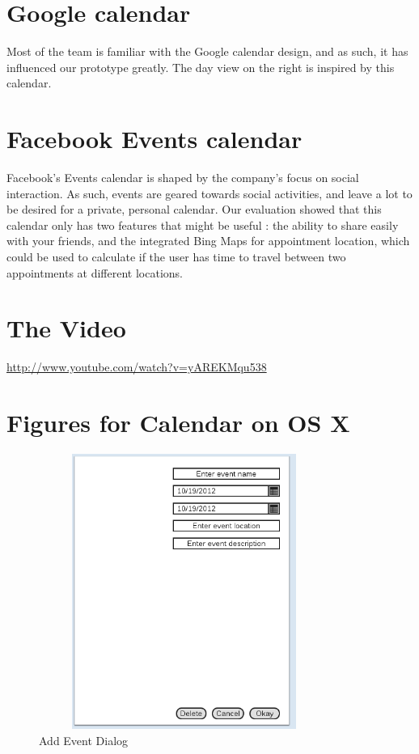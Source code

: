 \documentclass{article}
\begin{document}
\section{Google calendar}

Most of the team is familiar with the Google calendar design, and as such, it 
has influenced our prototype greatly. The day view on the right is inspired by 
this calendar.

\section{Facebook Events calendar}

Facebook's Events calendar is shaped by the company's focus on social 
interaction. As such, events are geared towards social activities, and leave a 
lot to be desired for a private, personal calendar. Our evaluation showed that 
this calendar only has two features that might be useful : the ability to share 
easily with your friends, and the integrated Bing Maps for appointment location, 
which could be used to calculate if the user has time to travel between two 
appointments at different locations.


\section{The Video}

\url{http://www.youtube.com/watch?v=yAREKMqu538}


\appendix

\section{Figures for Calendar on OS X}

\begin{figure}
\centering
\includegraphics[height=9cm,width=9.5cm]{CMCLGDREvent.png}
\caption{Add Event Dialog}
\label{fig:addevent}
\end{figure}
\end{document}
